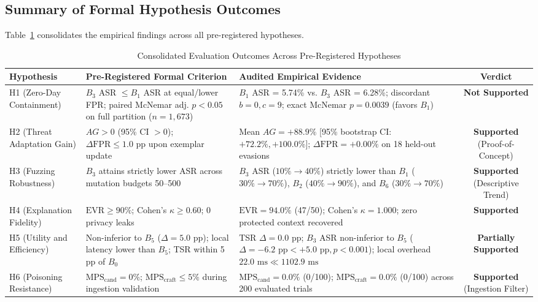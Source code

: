 \documentclass[conference]{IEEEtran}
\begin{document}
\subsection{Summary of Formal Hypothesis Outcomes}
Table~\ref{tab:hypotheses_summary} consolidates the empirical findings across all pre-registered hypotheses.

\begin{table}[t]
\centering
\caption{Consolidated Evaluation Outcomes Across Pre-Registered Hypotheses}
\label{tab:hypotheses_summary}
\begin{tabular}{l p{5.0cm} p{7.5cm} c}
\hline
\textbf{Hypothesis} & \textbf{Pre-Registered Formal Criterion} & \textbf{Audited Empirical Evidence} & \textbf{Verdict} \\
\hline
H1 (Zero-Day Containment) & $B_3$ ASR $\le B_1$ ASR at equal/lower FPR; paired McNemar adj. $p < 0.05$ on full partition ($n=1,673$) & $B_1$ ASR = 5.74\% vs. $B_3$ ASR = 6.28\%; discordant $b=0, c=9$; exact McNemar $p = 0.0039$ (favors $B_1$) & \textbf{Not Supported} \\
H2 (Threat Adaptation Gain) & $AG > 0$ (95\% CI $> 0$); $\Delta\text{FPR} \le 1.0\text{ pp}$ upon exemplar update & Mean $AG = +88.9\%$ [95\% bootstrap CI: $+72.2\%, +100.0\%$]; $\Delta\text{FPR} = +0.00\%$ on 18 held-out evasions & \textbf{Supported} (Proof-of-Concept) \\
H3 (Fuzzing Robustness) & $B_3$ attains strictly lower ASR across mutation budgets 50--500 & $B_3$ ASR ($10\% \to 40\%$) strictly lower than $B_1$ ($30\% \to 70\%$), $B_2$ ($40\% \to 90\%$), and $B_6$ ($30\% \to 70\%$) & \textbf{Supported} (Descriptive Trend) \\
H4 (Explanation Fidelity) & $\text{EVR} \ge 90\%$; Cohen's $\kappa \ge 0.60$; 0 privacy leaks & $\text{EVR} = 94.0\%$ (47/50); Cohen's $\kappa = 1.000$; zero protected context recovered & \textbf{Supported} \\
H5 (Utility and Efficiency) & Non-inferior to $B_5$ ($\Delta = 5.0\text{ pp}$); local latency lower than $B_5$; TSR within 5 pp of $B_0$ & TSR $\Delta = 0.0\text{ pp}$; $B_3$ ASR non-inferior to $B_5$ ($\Delta = -6.2\text{ pp} < +5.0\text{ pp}, p < 0.001$); local overhead $22.0\text{ ms} \ll 1102.9\text{ ms}$ & \textbf{Partially Supported} \\
H6 (Poisoning Resistance) & $\text{MPS}_{\text{cand}} = 0\%$; $\text{MPS}_{\text{craft}} \le 5\%$ during ingestion validation & $\text{MPS}_{\text{cand}} = 0.0\%$ (0/100); $\text{MPS}_{\text{craft}} = 0.0\%$ (0/100) across 200 evaluated trials & \textbf{Supported} (Ingestion Filter) \\
\hline
\end{tabular}
\end{table}
\end{document}

